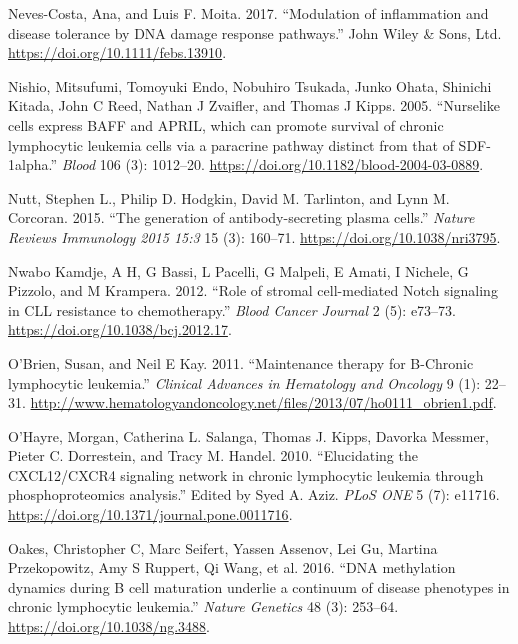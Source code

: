 \documentclass[11pt, a4paper, twosided]{book}
\newenvironment{CSLReferences}%
  {}%
  {\par}
\begin{document}
\begin{CSLReferences}{1}{0}
\leavevmode{}%
Neves-Costa, Ana, and Luis F. Moita. 2017. {``{Modulation of inflammation and disease tolerance by DNA damage response pathways}.''} John Wiley \& Sons, Ltd. \url{https://doi.org/10.1111/febs.13910}.

\leavevmode{}%
Nishio, Mitsufumi, Tomoyuki Endo, Nobuhiro Tsukada, Junko Ohata, Shinichi Kitada, John C Reed, Nathan J Zvaifler, and Thomas J Kipps. 2005. {``{Nurselike cells express BAFF and APRIL, which can promote survival of chronic lymphocytic leukemia cells via a paracrine pathway distinct from that of SDF-1alpha.}''} \emph{Blood} 106 (3): 1012--20. \url{https://doi.org/10.1182/blood-2004-03-0889}.

\leavevmode{}%
Nutt, Stephen L., Philip D. Hodgkin, David M. Tarlinton, and Lynn M. Corcoran. 2015. {``{The generation of antibody-secreting plasma cells}.''} \emph{Nature Reviews Immunology 2015 15:3} 15 (3): 160--71. \url{https://doi.org/10.1038/nri3795}.

\leavevmode{}%
Nwabo Kamdje, A H, G Bassi, L Pacelli, G Malpeli, E Amati, I Nichele, G Pizzolo, and M Krampera. 2012. {``{Role of stromal cell-mediated Notch signaling in CLL resistance to chemotherapy}.''} \emph{Blood Cancer Journal} 2 (5): e73--73. \url{https://doi.org/10.1038/bcj.2012.17}.

\leavevmode{}%
O'Brien, Susan, and Neil E Kay. 2011. {``{Maintenance therapy for B-Chronic lymphocytic leukemia}.''} \emph{Clinical Advances in Hematology and Oncology} 9 (1): 22--31. \url{http://www.hematologyandoncology.net/files/2013/07/ho0111_obrien1.pdf}.

\leavevmode{}%
O'Hayre, Morgan, Catherina L. Salanga, Thomas J. Kipps, Davorka Messmer, Pieter C. Dorrestein, and Tracy M. Handel. 2010. {``{Elucidating the CXCL12/CXCR4 signaling network in chronic lymphocytic leukemia through phosphoproteomics analysis}.''} Edited by Syed A. Aziz. \emph{PLoS ONE} 5 (7): e11716. \url{https://doi.org/10.1371/journal.pone.0011716}.

\leavevmode{}%
Oakes, Christopher C, Marc Seifert, Yassen Assenov, Lei Gu, Martina Przekopowitz, Amy S Ruppert, Qi Wang, et al. 2016. {``{DNA methylation dynamics during B cell maturation underlie a continuum of disease phenotypes in chronic lymphocytic leukemia}.''} \emph{Nature Genetics} 48 (3): 253--64. \url{https://doi.org/10.1038/ng.3488}.


\end{CSLReferences}
\end{document}

